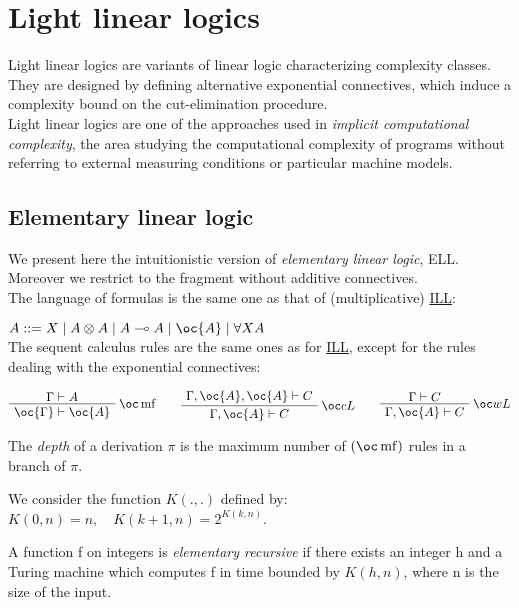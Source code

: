 \chapter{Light linear logics}\label{light-linear-logics}

Light linear logics are variants of linear logic characterizing
complexity classes. They are designed by defining alternative
exponential connectives, which induce a complexity bound on the
cut-elimination procedure.\\
Light linear logics are one of the approaches used in \emph{implicit
computational complexity}, the area studying the computational
complexity of programs without referring to external measuring
conditions or particular machine models.

\section{Elementary linear logic}\label{elementary-linear-logic}

We present here the intuitionistic version of \emph{elementary linear
logic}, ELL. Moreover we restrict to the fragment without additive
connectives.\\
The language of formulas is the same one as that of (multiplicative)
\href{Intuitionistic_linear_logic}{ILL}:

\(A ::= X \mid A\tens A \mid A\limp A  \mid \oc{A} \mid \forall X A\)\\
The sequent calculus rules are the same ones as for
\href{Intuitionistic_linear_logic}{ILL}, except for the rules dealing
with the exponential connectives:

\(\AxRule{\Gamma\vdash A}
\LabelRule{\oc\rulename{mf} }
\UnaRule{\oc{\Gamma}\vdash\oc{A}}
\DisplayProof
\qquad
\AxRule{\Gamma,\oc{A},\oc{A}\vdash C}
\LabelRule{\oc c L}
\UnaRule{\Gamma,\oc{A}\vdash C}
\DisplayProof
\qquad
\AxRule{\Gamma\vdash C}
\LabelRule{\oc w L}
\UnaRule{\Gamma,\oc{A}\vdash C}
\DisplayProof\)

The \emph{depth} of a derivation \(\pi\) is the maximum number of
\((\oc\rulename{mf})\) rules in a branch of \(\pi\).

We consider the function \(K(.,.)\) defined by:\\
\(K(0,n)=n, \quad K(k+1,n)=2^{K(k,n)}\).

A function f on integers is \emph{elementary recursive} if there exists
an integer h and a Turing machine which computes f in time bounded by
\(K(h,n)\), where n is the size of the input.

